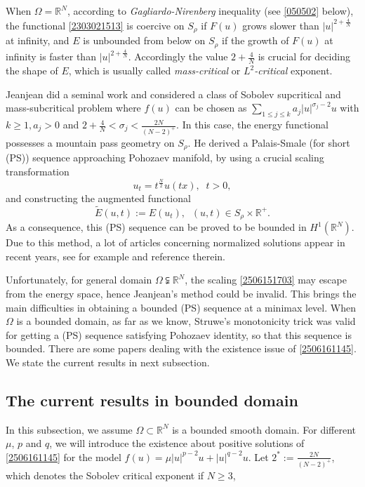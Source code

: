 \documentclass[10pt]{article}
\numberwithin{equation}{section}
\numberwithin{equation}{section}
\begin{document}
When $\Omega=\mathbb{R}^N$, according to {\it Gagliardo-Nirenberg} inequality (see \eqref{050502} below), the functional \eqref{2303021513} is coercive on $S_\rho$ if $F(u)$ grows slower than $|u|^{2+\frac{4}{N}}$ at infinity, and $E$ is unbounded from below on $S_\rho$ if the growth of $F(u)$ at infinity is faster than $|u|^{2+\frac{4}{N}}$. Accordingly the value $2+\frac{4}{N}$ is crucial for deciding the shape of $E$, which is usually called {\it mass-critical} or {\it$L^2$-critical} exponent.

Jeanjean  \cite{Jeanjean97} did a seminal work and considered a class of Sobolev supcritical and mass-subcritical problem where $f(u)$ can be chosen as $\sum\limits_{1\leq j \leq k}a_j|u|^{\sigma_j-2}u$ with $k\ge 1, a_j>0$ and $2+\frac{4}{N}<\sigma_j<\frac{2N}{(N-2)^+}$. In this case, the energy functional possesses a mountain pass geometry on $S_\rho$. He derived a Palais-Smale (for short (PS)) sequence approaching Pohozaev manifold, by using a crucial scaling transformation
\begin{equation}\label{2506151703}
u_t=t^{\frac{N}{2}}u(tx),\;\; t>0,
\end{equation}
and constructing the augmented functional
$$\widetilde{E}(u, t):=E(u_t), \;\; (u, t)\in S_\rho\times \mathbb{R}^+.$$
As a consequence, this (PS) sequence can be proved to be bounded in $H^1(\mathbb{R}^N)$. Due to this method, a lot of articles concerning normalized solutions appear in recent years, see for example \cite{BMRV2021, JZ2024, MRV2022, Soave20_JDE, Soave20_JFA} and reference therein.

\smallskip
Unfortunately, for general domain $\Omega\subsetneqq\mathbb{R}^N$, the scaling \eqref{2506151703} may escape from the energy space,  hence Jeanjean's method could be invalid. This brings the main difficulties in obtaining a bounded (PS) sequence at a minimax level. When $\Omega$ is a bounded domain, as far as we know, Struwe's monotonicity trick was valid for getting a (PS) sequence satisfying Pohozaev identity, so that this sequence is bounded. There are some papers dealing with the existence issue of  \eqref{2506161145}. We state the current results in next subsection.

\subsection{The current results in bounded domain}

In this subsection, we assume $\Omega\subset\mathbb{R}^N$ is a bounded smooth domain. For different $\mu$, $p$ and $q$, we will introduce the existence about  positive solutions of \eqref{2506161145} for the model $f(u)=\mu |u|^{p-2}u+|u|^{q-2}u$.   Let $2^{*}:=\frac{2N}{(N-2)^+}$, which denotes the Sobolev critical  exponent if $N\ge 3$, 
\end{document}
